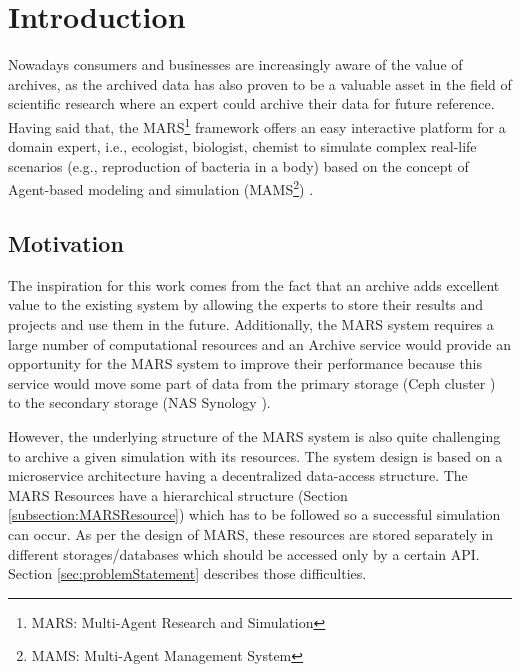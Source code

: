 \frenchspacing
\newpage
    \chapter{Introduction}
    Nowadays consumers and businesses are increasingly aware of the value of archives, as the archived data has also proven
    to be a valuable asset in the field of scientific research where an expert could archive their data for future reference. Having said that, the 
    MARS\footnote{MARS: Multi-Agent Research and Simulation} framework offers an easy interactive platform for a domain expert, i.e., ecologist, biologist, 
    chemist to simulate complex real-life scenarios (e.g., reproduction of bacteria in a body) based on the concept of Agent-based modeling and simulation 
    (MAMS\footnote{MAMS: Multi-Agent Management System}) \cite{agentModeling}.

        \section{Motivation}
        The inspiration for this work comes from the fact that an archive adds excellent value to the existing system by allowing the experts to store 
        their results and projects and use them in the future. Additionally, the MARS system requires a large number of computational resources and
        an Archive service would provide an opportunity for the MARS system to improve their
        performance because this service would move some part of data from the primary storage (Ceph cluster \cite{Ceph}) to the secondary storage (NAS Synology \cite{Synology}). 

        However, the underlying structure of the MARS system is also quite challenging to archive 
        a given simulation with its resources. The system design is based on a microservice architecture \cite{MicroserviceNewMan} having a decentralized data-access \cite{atomic} structure. 
        The MARS Resources have a hierarchical
        structure (Section \ref{subsection:MARSResource}) which has to be followed so a successful simulation can occur. As per the design of MARS, these resources
        are stored separately in different storages/databases which should be accessed only by a certain API. Section
        \ref{sec:problemStatement} describes those difficulties.  

